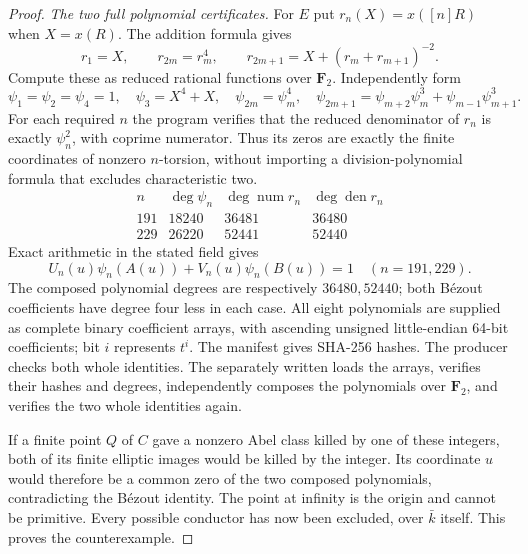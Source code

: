 \begin{proof}
\emph{The two full polynomial certificates.}
For $E$ put $r_n(X)=x([n]R)$ when $X=x(R)$. The addition formula gives
\[
 r_1=X,\qquad r_{2m}=r_m^4,\qquad
 r_{2m+1}=X+(r_m+r_{m+1})^{-2}.
\]
Compute these as reduced rational functions over $\mathbf F_2$.
Independently form
\[
 \psi_1=\psi_2=\psi_4=1,\quad\psi_3=X^4+X,\quad
 \psi_{2m}=\psi_m^4,\quad
 \psi_{2m+1}=\psi_{m+2}\psi_m^3+\psi_{m-1}\psi_{m+1}^3.
\]
For each required $n$ the program verifies that the reduced
denominator of $r_n$ is exactly $\psi_n^2$, with coprime numerator.
Thus its zeros are exactly the finite coordinates of nonzero
$n$-torsion, without importing a division-polynomial formula
that excludes characteristic two.
\[
\begin{array}{c|r|r|r}
 n&\deg\psi_n&\deg\operatorname{num}r_n&
                  \deg\operatorname{den}r_n\\ \hline
191&18240&36481&36480\\
229&26220&52441&52440
\end{array}
\]
Exact arithmetic in the stated field gives
\[
 U_n(u)\psi_n(A(u))+V_n(u)\psi_n(B(u))=1
                    \quad(n=191,229).
\]
The composed polynomial degrees are respectively $36480,52440$;
both B\'ezout coefficients have degree four less in each case.
All eight polynomials are supplied as complete binary coefficient
arrays, with ascending unsigned little-endian 64-bit coefficients;
bit $i$ represents $t^i$. The manifest gives SHA-256 hashes.
The producer checks both whole identities. The separately written
 loads the arrays, verifies their
hashes and degrees, independently composes the polynomials over
$\mathbf F_2$, and verifies the two whole identities again.

If a finite point $Q$ of $C$ gave a nonzero Abel class killed by
one of these integers, both of its finite elliptic images would
be killed by the integer. Its coordinate $u$ would therefore be a
common zero of the two composed polynomials, contradicting the
B\'ezout identity. The point at infinity is the origin and cannot
be primitive. Every possible conductor has now been excluded,
over $\bar k$ itself. This proves the counterexample.
\end{proof}

